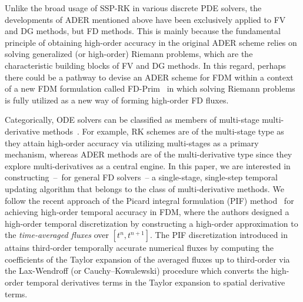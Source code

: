 \documentclass[times,preprint,3p]{elsarticle}
\begin{document}
Unlike the broad usage of SSP-RK in various discrete PDE solvers,
the developments of ADER mentioned above have been exclusively
applied to FV and DG methods, but FD methods.
This is mainly because the fundamental principle of obtaining high-order accuracy
in the original ADER scheme relies on solving generalized (or high-order) Riemann
problems, which are the characteristic building blocks of FV and DG methods.
In this regard, perhaps there could be a pathway to devise an ADER scheme for FDM
within a context of a new FDM formulation called
FD-Prim~\cite{del2007echo,chen2016fifth,reyes2019variable}
in which solving Riemann problems is fully utilized as a new way of forming
high-order FD fluxes.

Categorically, ODE solvers can be classified as members of
multi-stage multi-derivative
methods~\cite{hairer1973multistep,seal2014high}.
For example, RK schemes are of the multi-stage type as they
attain high-order accuracy
via utilizing multi-stages as a primary mechanism,
whereas ADER methods are of the multi-derivative type
since they explore multi-derivatives as a central
engine.
%
In this paper, we are interested in constructing~--~for general FD solvers~--
a single-stage, single-step temporal updating algorithm
that belongs to the class of multi-derivative methods.
%
We follow the recent approach of
the Picard integral formulation (PIF) method~\cite{christlieb2015picard, seal2016explicit}
for achieving high-order temporal accuracy in FDM, where
the authors designed a high-order temporal discretization by constructing
a high-order approximation to the \textit{time-averaged fluxes} over $[t^n, t^{n+1}]$.
The PIF discretization introduced in~\cite{christlieb2015picard}
attains third-order temporally accurate numerical fluxes by computing
the coefficients of the Taylor expansion of the averaged fluxes up to third-order
via the Lax-Wendroff (or Cauchy–Kowalewski) procedure which converts
the high-order temporal derivatives terms in the Taylor expansion
to spatial derivative terms.
%
\end{document}
